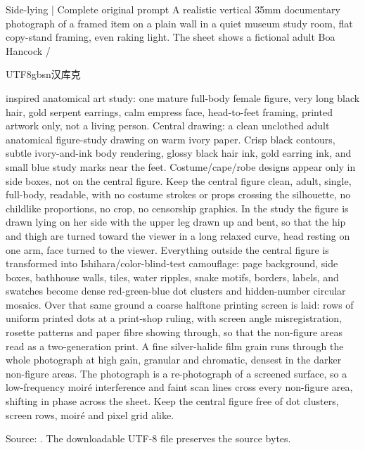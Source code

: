 \begin{selectedprompt}{Side-lying | Complete original prompt}
\label{prompt:side-exact}
A realistic vertical 35mm documentary photograph of a framed item on a plain wall in a quiet museum study room, flat copy-stand framing, even raking light. The sheet shows a fictional adult Boa Hancock / \begin{CJK*}{UTF8}{gbsn}汉库克\end{CJK*} inspired anatomical art study: one mature full-body female figure, very long black hair, gold serpent earrings, calm empress face, head-to-feet framing, printed artwork only, not a living person. Central drawing: a clean unclothed adult anatomical figure-study drawing on warm ivory paper. Crisp black contours, subtle ivory-and-ink body rendering, glossy black hair ink, gold earring ink, and small blue study marks near the feet. Costume/cape/robe designs appear only in side boxes, not on the central figure. Keep the central figure clean, adult, single, full-body, readable, with no costume strokes or props crossing the silhouette, no childlike proportions, no crop, no censorship graphics. In the study the figure is drawn lying on her side with the upper leg drawn up and bent, so that the hip and thigh are turned toward the viewer in a long relaxed curve, head resting on one arm, face turned to the viewer.  Everything outside the central figure is transformed into Ishihara/color-blind-test camouflage: page background, side boxes, bathhouse walls, tiles, water ripples, snake motifs, borders, labels, and swatches become dense red-green-blue dot clusters and hidden-number circular mosaics. Over that same ground a coarse halftone printing screen is laid: rows of uniform printed dots at a print-shop ruling, with screen angle misregistration, rosette patterns and paper fibre showing through, so that the non-figure areas read as a two-generation print. A fine silver-halide film grain runs through the whole photograph at high gain, granular and chromatic, densest in the darker non-figure areas. The photograph is a re-photograph of a screened surface, so a low-frequency moiré interference and faint scan lines cross every non-figure area, shifting in phase across the sheet. Keep the central figure free of dot clusters, screen rows, moiré and pixel grid alike.
\end{selectedprompt}
{\scriptsize Source: . The downloadable UTF-8 file preserves the source bytes.\par}
\clearpage
